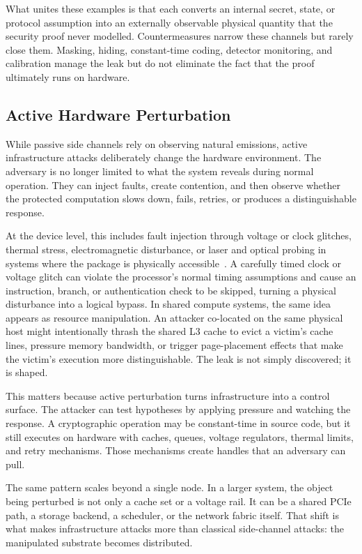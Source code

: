 What unites these examples is that each converts an internal secret, state, or protocol assumption into an externally observable physical quantity that the security proof never modelled. Countermeasures narrow these channels but rarely close them. Masking, hiding, constant-time coding, detector monitoring, and calibration manage the leak but do not eliminate the fact that the proof ultimately runs on hardware.

\subsection{Active Hardware Perturbation}
\label{sec:active-hardware-perturbation}

While passive side channels rely on observing natural emissions, active infrastructure attacks deliberately change the hardware environment. The adversary is no longer limited to what the system reveals during normal operation. They can inject faults, create contention, and then observe whether the protected computation slows down, fails, retries, or produces a distinguishable response.

At the device level, this includes fault injection through voltage or clock glitches, thermal stress, electromagnetic disturbance, or laser and optical probing in systems where the package is physically accessible~\cite{skorobogatov2003optical}. A carefully timed clock or voltage glitch can violate the processor's normal timing assumptions and cause an instruction, branch, or authentication check to be skipped, turning a physical disturbance into a logical bypass. In shared compute systems, the same idea appears as resource manipulation. An attacker co-located on the same physical host might intentionally thrash the shared L3 cache to evict a victim's cache lines, pressure memory bandwidth, or trigger page-placement effects that make the victim's execution more distinguishable. The leak is not simply discovered; it is shaped.

This matters because active perturbation turns infrastructure into a control surface. The attacker can test hypotheses by applying pressure and watching the response. A cryptographic operation may be constant-time in source code, but it still executes on hardware with caches, queues, voltage regulators, thermal limits, and retry mechanisms. Those mechanisms create handles that an adversary can pull.

The same pattern scales beyond a single node. In a larger system, the object being perturbed is not only a cache set or a voltage rail. It can be a shared PCIe path, a storage backend, a scheduler, or the network fabric itself. That shift is what makes infrastructure attacks more than classical side-channel attacks: the manipulated substrate becomes distributed.

